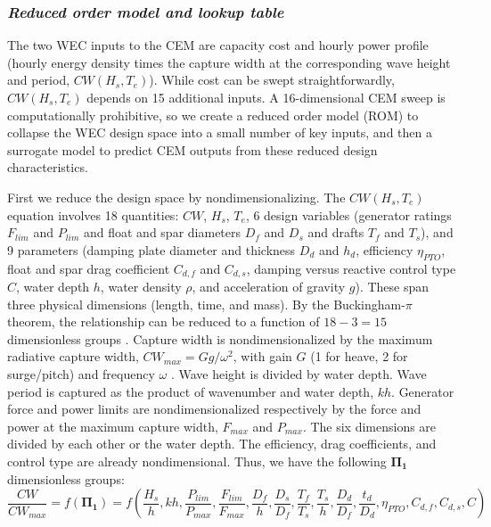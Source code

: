 \documentclass[10pt,twoside]{article}
\begin{document}
\subsubsection{\textit{Reduced order model and lookup table}}
The two WEC inputs to the CEM are capacity cost and hourly power profile (hourly energy density times the capture width at the corresponding wave height and period, $CW(H_s,T_e)$).
While cost can be swept straightforwardly, $CW(H_s,T_e)$ depends on 15 additional inputs. 
A 16-dimensional CEM sweep is computationally prohibitive, so we create a reduced order model (ROM) to collapse the WEC design space into a small number of key inputs, and then a surrogate model to predict CEM outputs from these reduced design characteristics.

First we reduce the design space by nondimensionalizing.
The $CW(H_s,T_e)$ equation involves 18 quantities: $CW$, $H_s$, $T_e$, 
6 design variables (generator ratings $F_{lim}$ and $P_{lim}$ and float and spar diameters $D_f$ and $D_s$ and drafts $T_f$ and $T_s$), 
and 9 parameters (damping plate diameter and thickness $D_d$ and $h_d$, efficiency $\eta_{PTO}$, float and spar drag coefficient $C_{d,f}$ and $C_{d,s}$, damping versus reactive control type $C$, water depth $h$, water density $\rho$, and acceleration of gravity $g$). 
These span three physical dimensions (length, time, and mass).
By the Buckingham-$\pi$ theorem, the relationship can be reduced to a function of $18-3=15$ dimensionless groups \cite{mckinley-buckingham-2021}. 
Capture width is nondimensionalized by the maximum radiative capture width, $CW_{max}=Gg/\omega^2$, with gain $G$ (1 for heave, 2 for surge/pitch) and frequency $\omega$ \cite{zou_practical_2023}. %
Wave height is divided by water depth. %
Wave period is captured as the product of wavenumber and water depth, $kh$. %
Generator force and power limits are nondimensionalized respectively by the force and power at the maximum capture width, $F_{max}$ and $P_{max}$. %
The six dimensions are divided by each other or the water depth.%
The efficiency, drag coefficients, and control type are already nondimensional. %
Thus, we have the following $\mathbf{\Pi_1}$ dimensionless groups:
\begin{equation}
    \frac{CW}{CW_{max}} = f\left( \mathbf{\Pi_1} \right) = f\left(\frac{H_s}{h}, kh, 
    \frac{P_{lim}}{P_{max}}, \frac{F_{lim}}{F_{max}},
    \frac{D_f}{h}, \frac{D_s}{D_f}, \frac{T_f}{T_s}, \frac{T_s}{h}, \frac{D_d}{D_f}, \frac{t_d}{D_d}, 
    \eta_{PTO}, C_{d,f}, C_{d,s},  C\right)
\end{equation}
\end{document}
